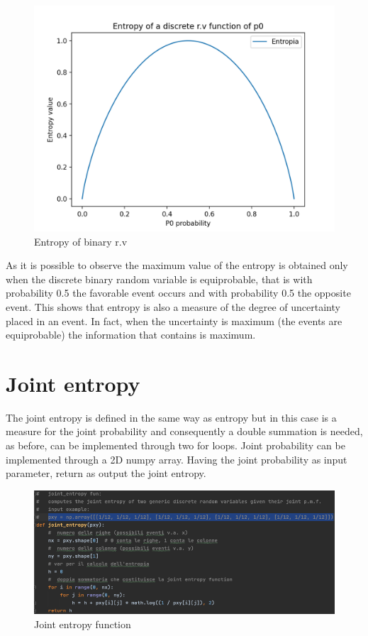 \documentclass[12pt]{report}
\begin{document}
\begin{figure}[h!]
    \centering
    \includegraphics[width=14cm]{Pictures/entropy-test.png}
    \caption{Entropy of binary r.v}
\end{figure}

As it is possible to observe the maximum value of the entropy is obtained only when the discrete binary random variable is equiprobable, that is with probability 0.5 the favorable event occurs and with probability 0.5 the opposite event. This shows that entropy is also a measure of the degree of uncertainty placed in an event. In fact, when the uncertainty is maximum (the events are equiprobable) the information that contains is maximum.

\section{Joint entropy}
The joint entropy is defined in the same way as entropy but in this case is a measure for the joint probability and consequently a double summation is needed, as before, can be implemented through two for loops. Joint probability can be implemented through a 2D numpy array. Having the joint probability as input parameter, return as output the joint entropy.
\begin{figure}[h!]
    \centering
    \includegraphics[width=14cm]{Pictures/joint entropy.png}
    \caption{Joint entropy function}
\end{figure}
\end{document}
